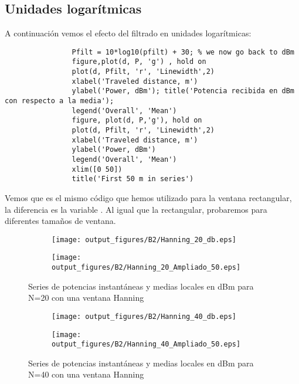 \documentclass{article}
\begin{document}
        \subsection{Unidades logarítmicas}
        \par A continuación vemos el efecto del filtrado en unidades logarítmicas:
        \begin{lstlisting}
                Pfilt = 10*log10(pfilt) + 30; % we now go back to dBm  
                figure,plot(d, P, 'g') , hold on
                plot(d, Pfilt, 'r', 'Linewidth',2)
                xlabel('Traveled distance, m')
                ylabel('Power, dBm'); title('Potencia recibida en dBm con respecto a la media');
                legend('Overall', 'Mean')
                figure, plot(d, P,'g'), hold on
                plot(d, Pfilt, 'r', 'Linewidth',2)
                xlabel('Traveled distance, m')
                ylabel('Power, dBm')
                legend('Overall', 'Mean')
                xlim([0 50])
                title('First 50 m in series')
        \end{lstlisting}
        \par Vemos que es el mismo código que hemos utilizado para la ventana rectangular, la diferencia es la variable . Al igual que la rectangular, probaremos para diferentes tamaños de ventana.
        \begin{figure}[h]
                \centering
                \begin{subfigure}
                    \centering          \texttt{[image: output\_figures/B2/Hanning\_20\_db.eps]}
               \end{subfigure}
               \begin{subfigure}
                    \centering          \texttt{[image: output\_figures/B2/Hanning\_20\_Ampliado\_50.eps]}
               \end{subfigure}    
               \caption{Series de potencias instantáneas y medias locales en dBm para N=20 con una ventana Hanning}
                \label{fig:sup_rugosas}
            \end{figure}
            \clearpage
            
            
        \begin{figure}[h]
                \centering
                \begin{subfigure}
                    \centering          \texttt{[image: output\_figures/B2/Hanning\_40\_db.eps]}
               \end{subfigure}
               \begin{subfigure}
                    \centering          \texttt{[image: output\_figures/B2/Hanning\_40\_Ampliado\_50.eps]}
               \end{subfigure}    
               \caption{Series de potencias instantáneas y medias locales en dBm para N=40 con una ventana Hanning}
                \label{fig:sup_rugosas}
            \end{figure}
            
\end{document}
